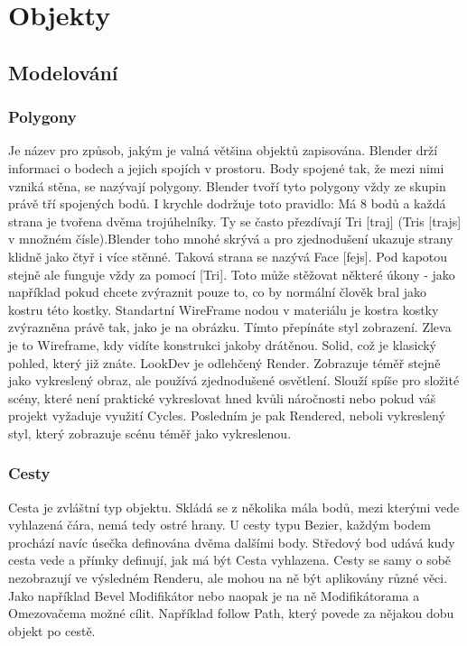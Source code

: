 \documentclass[12pt,a4paper]{report}
\begin{document}
	\chapter{Objekty}
	\section{Modelování}
	\subsection{Polygony}
	Je název pro způsob, jakým je valná většina objektů zapisována. Blender
	drží informaci o bodech a jejich spojích v prostoru. Body spojené tak, že
	mezi nimi vzniká stěna, se nazývají polygony. Blender tvoří tyto polygony
	vždy ze skupin právě tří spojených bodů. I krychle dodržuje toto pravidlo:
	Má 8 bodů a každá strana je tvořena dvěma trojúhelníky. Ty se často
	přezdívají Tri [traj] (Tris [trajs] v množném čísle).Blender toho mnohé skrývá a pro zjednodušení ukazuje strany klidně jako
	čtyř i více stěnné. Taková strana se nazývá Face [fejs]. Pod kapotou
	stejně ale funguje vždy za pomocí [Tri]. Toto může stěžovat některé
	úkony - jako například pokud chcete zvýraznit pouze to, co by normální
	člověk bral jako kostru této kostky. Standartní WireFrame nodou
	v materiálu je kostra kostky zvýrazněna právě tak, jako je na obrázku.
	Tímto přepínáte styl zobrazení. Zleva je to
	Wireframe, kdy vidíte konstrukci jakoby drátěnou. Solid, což je klasický
	pohled, který již znáte. LookDev je odlehčený Render. Zobrazuje téměř
	stejně jako vykreslený obraz, ale používá zjednodušené osvětlení. Slouží
	spíše pro složité scény, které není praktické vykreslovat hned kvůli
	náročnosti nebo pokud váš projekt vyžaduje využití Cycles. Posledním je
	pak Rendered, neboli vykreslený styl, který zobrazuje scénu téměř jako
	vykreslenou.
	
	\subsection{Cesty}
	Cesta je zvláštní typ objektu. Skládá se z několika mála bodů, mezi
	kterými vede vyhlazená čára, nemá tedy ostré hrany. U cesty typu Bezier,
	každým bodem prochází navíc úsečka definována dvěma dalšími body.
	Středový bod udává kudy cesta vede a přímky definují, jak má být Cesta
	vyhlazena.
	Cesty se samy o sobě nezobrazují ve výsledném Renderu, ale mohou na
	ně být aplikovány různé věci. Jako například Bevel Modifikátor nebo
	naopak je na ně Modifikátorama a Omezovačema možné cílit. Například
	follow Path, který povede za nějakou dobu objekt po cestě.
	
\end{document}
